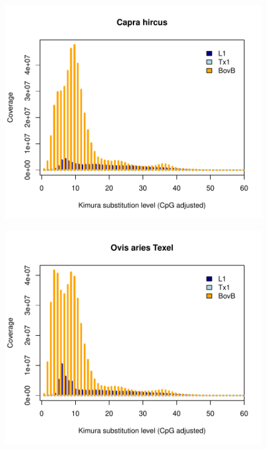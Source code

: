\documentclass[12pt,a4paper,times]{article}
\begin{document}
\begin{figure}[H]
	\centering
	\includegraphics[scale=0.8]{suppFigures/divergencePlots/Capra_hircus.pdf}
	\caption{\label{Capra}}
\end{figure}

\begin{figure}[H]
	\centering
	\includegraphics[scale=0.8]{suppFigures/divergencePlots/Ovis_aries_Texel.pdf}
	\caption{\label{OvisT}}
\end{figure}
\end{document}
